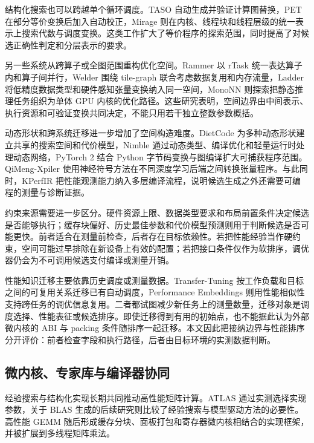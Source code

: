 结构化搜索也可以跨越单个循环调度。TASO 自动生成并验证计算图替换\cite{Jia2019TASO}，PET 在部分等价变换后加入自动校正\cite{Wang2021PET}，Mirage 则在内核、线程块和线程层级的统一表示上搜索代数与调度变换\cite{Wu2025Mirage}。这类工作扩大了等价程序的探索范围，同时提高了对候选正确性判定和分层表示的要求。

另一些系统从跨算子或全图范围重构优化空间。Rammer 以 rTask 统一表达算子内和算子间并行\cite{Ma2020Rammer}，Welder 围绕 tile-graph 联合考虑数据复用和内存流量\cite{Shi2023Welder}，Ladder 将低精度数据类型和硬件感知张量变换纳入同一空间\cite{Wang2024Ladder}，MonoNN 则探索把静态推理任务组织为单体 GPU 内核的优化路径\cite{Zhuang2024MonoNN}。这些研究表明，空间边界由中间表示、执行资源和可验证变换共同决定，不能只用若干独立整数参数概括。

动态形状和跨系统迁移进一步增加了空间构造难度。DietCode 为多种动态形状建立共享的搜索空间和代价模型\cite{Zheng2022DietCode}，Nimble 通过动态类型、编译优化和轻量运行时处理动态网络\cite{Shen2021Nimble}，PyTorch 2 结合 Python 字节码变换与图编译扩大可捕获程序范围\cite{Ansel2024PyTorch2}。QiMeng-Xpiler 使用神经符号方法在不同深度学习后端之间转换张量程序\cite{Dong2025QiMengXpiler}。与此同时，KPerfIR 把性能观测能力纳入多层编译流程\cite{Guan2025KPerfIR}，说明候选生成之外还需要可编程的测量与诊断证据。

约束来源需要进一步区分。硬件资源上限、数据类型要求和布局前置条件决定候选是否能够执行；缓存块偏好、历史最佳参数和代价模型预测则用于判断候选是否可能更快。前者适合在测量前检查，后者存在目标依赖性。若把性能经验当作硬约束，空间可能过早排除在新设备上有效的配置；若把接口条件仅作为软排序，调优器仍会为不可调用候选支付编译或测量开销。

性能知识迁移主要依靠历史调度或测量数据。Transfer-Tuning 按工作负载和目标之间的可复用关系迁移已有自动调度\cite{Gibson2022TransferTuning}，Performance Embeddings 则用性能相似性支持跨任务的调优信息复用\cite{Truemper2023PerformanceEmbeddings}。二者都试图减少新任务上的测量数量，迁移对象是调度选择、性能表征或候选排序。即使迁移得到有用的初始点，也不能据此认为外部微内核的 ABI 与 packing 条件随排序一起迁移。本文因此把接纳边界与性能排序分开评价：前者检查字段和执行路径，后者由目标环境的实测数据判断。

\subsection{微内核、专家库与编译器协同}

经验搜索与结构化实现长期共同推动高性能矩阵计算。ATLAS 通过实测选择实现参数\cite{Whaley2001ATLAS}，关于 BLAS 生成的后续研究则比较了经验搜索与模型驱动方法的必要性\cite{Yotov2005SearchBLAS}。高性能 GEMM 随后形成缓存分块、面板打包和寄存器微内核相结合的实现框架\cite{Goto2008Anatomy}，并被扩展到多线程矩阵乘法\cite{Smith2014ManyThreadedGEMM}。

